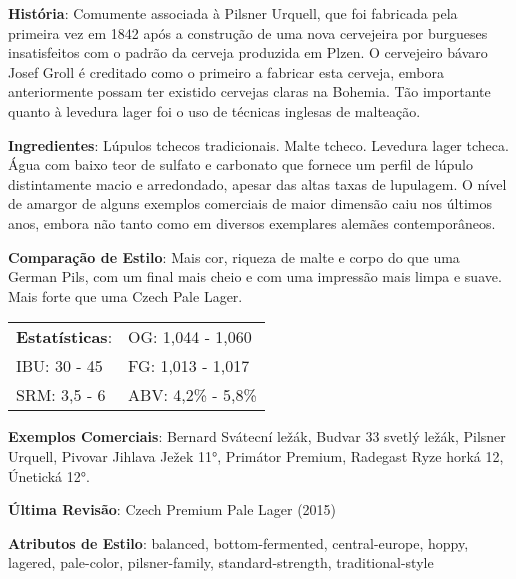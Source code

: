 \textbf{História}: Comumente associada à Pilsner Urquell, que foi fabricada pela primeira vez em 1842 após a construção de uma nova cervejeira por burgueses insatisfeitos com o padrão da cerveja produzida em Plzen. O cervejeiro bávaro Josef Groll é creditado como o primeiro a fabricar esta cerveja, embora anteriormente possam ter existido cervejas claras na Bohemia. Tão importante quanto à levedura lager foi o uso de técnicas inglesas de malteação.

\textbf{Ingredientes}: Lúpulos tchecos tradicionais. Malte tcheco. Levedura lager tcheca. Água com baixo teor de sulfato e carbonato que fornece um perfil de lúpulo distintamente macio e arredondado, apesar das altas taxas de lupulagem. O nível de amargor de alguns exemplos comerciais de maior dimensão caiu nos últimos anos, embora não tanto como em diversos exemplares alemães contemporâneos.

\textbf{Comparação de Estilo}: Mais cor, riqueza de malte e corpo do que uma German Pils, com um final mais cheio e com uma impressão mais limpa e suave. Mais forte que uma Czech Pale Lager.

\begin{tabular}{@{}p{35mm}p{35mm}@{}}
  \textbf{Estatísticas}: & OG: 1,044 - 1,060 \\
  IBU: 30 - 45  & FG: 1,013 - 1,017  \\
  SRM: 3,5 - 6  & ABV: 4,2\% - 5,8\%
\end{tabular}

\textbf{Exemplos Comerciais}: Bernard Svátecní ležák, Budvar 33 svetlý ležák, Pilsner Urquell, Pivovar Jihlava Ježek 11°, Primátor Premium, Radegast Ryze horká 12, Únetická 12°.

\textbf{Última Revisão}: Czech Premium Pale Lager (2015)

\textbf{Atributos de Estilo}: balanced, bottom-fermented, central-europe, hoppy, lagered, pale-color, pilsner-family, standard-strength, traditional-style
